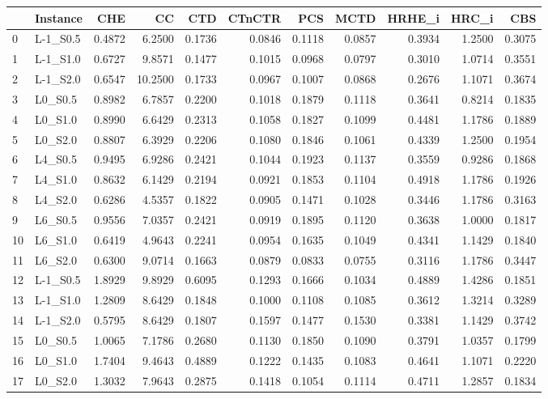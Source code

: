 \begin{tabular}{llrrrrrrrrr}
\toprule
 & Instance & CHE & CC & CTD & CTnCTR & PCS & MCTD & HRHE_i & HRC_i & CBS \\
\midrule
0 & L-1_S0.5 & 0.4872 & 6.2500 & 0.1736 & 0.0846 & 0.1118 & 0.0857 & 0.3934 & 1.2500 & 0.3075 \\
1 & L-1_S1.0 & 0.6727 & 9.8571 & 0.1477 & 0.1015 & 0.0968 & 0.0797 & 0.3010 & 1.0714 & 0.3551 \\
2 & L-1_S2.0 & 0.6547 & 10.2500 & 0.1733 & 0.0967 & 0.1007 & 0.0868 & 0.2676 & 1.1071 & 0.3674 \\
3 & L0_S0.5 & 0.8982 & 6.7857 & 0.2200 & 0.1018 & 0.1879 & 0.1118 & 0.3641 & 0.8214 & 0.1835 \\
4 & L0_S1.0 & 0.8990 & 6.6429 & 0.2313 & 0.1058 & 0.1827 & 0.1099 & 0.4481 & 1.1786 & 0.1889 \\
5 & L0_S2.0 & 0.8807 & 6.3929 & 0.2206 & 0.1080 & 0.1846 & 0.1061 & 0.4339 & 1.2500 & 0.1954 \\
6 & L4_S0.5 & 0.9495 & 6.9286 & 0.2421 & 0.1044 & 0.1923 & 0.1137 & 0.3559 & 0.9286 & 0.1868 \\
7 & L4_S1.0 & 0.8632 & 6.1429 & 0.2194 & 0.0921 & 0.1853 & 0.1104 & 0.4918 & 1.1786 & 0.1926 \\
8 & L4_S2.0 & 0.6286 & 4.5357 & 0.1822 & 0.0905 & 0.1471 & 0.1028 & 0.3446 & 1.1786 & 0.3163 \\
9 & L6_S0.5 & 0.9556 & 7.0357 & 0.2421 & 0.0919 & 0.1895 & 0.1120 & 0.3638 & 1.0000 & 0.1817 \\
10 & L6_S1.0 & 0.6419 & 4.9643 & 0.2241 & 0.0954 & 0.1635 & 0.1049 & 0.4341 & 1.1429 & 0.1840 \\
11 & L6_S2.0 & 0.6300 & 9.0714 & 0.1663 & 0.0879 & 0.0833 & 0.0755 & 0.3116 & 1.1786 & 0.3447 \\
12 & L-1_S0.5 & 1.8929 & 9.8929 & 0.6095 & 0.1293 & 0.1666 & 0.1034 & 0.4889 & 1.4286 & 0.1851 \\
13 & L-1_S1.0 & 1.2809 & 8.6429 & 0.1848 & 0.1000 & 0.1108 & 0.1085 & 0.3612 & 1.3214 & 0.3289 \\
14 & L-1_S2.0 & 0.5795 & 8.6429 & 0.1807 & 0.1597 & 0.1477 & 0.1530 & 0.3381 & 1.1429 & 0.3742 \\
15 & L0_S0.5 & 1.0065 & 7.1786 & 0.2680 & 0.1130 & 0.1850 & 0.1090 & 0.3791 & 1.0357 & 0.1799 \\
16 & L0_S1.0 & 1.7404 & 9.4643 & 0.4889 & 0.1222 & 0.1435 & 0.1083 & 0.4641 & 1.1071 & 0.2220 \\
17 & L0_S2.0 & 1.3032 & 7.9643 & 0.2875 & 0.1418 & 0.1054 & 0.1114 & 0.4711 & 1.2857 & 0.1834 \\

\end{tabular}
